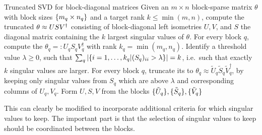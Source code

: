 \begin{Algorithm}{Truncated SVD for block-diagonal matrices}{
    Given an $m \times n$ block-sparse matrix $\theta$ with block sizes $\set{m_q \times n_q}$ and a target rank $k \leq \min(m, n)$, compute the truncated  $\theta\approx U S V^\dagger$ consisting of block-diagonal left isometries $U, V$, and $S$ the diagonal matrix containing the $k$ largest singular values of $\theta$.
    \label{algo:tensornets:symmetries:truncated_svd}
}
    \step For every block $q$, compute the  $\theta_q =: U_q S_q V_q^\dagger$ with rank $k_q = \min(m_q, n_q)$.
    \step Identify a threshold value $\lambda \geq 0$, such that $\sum_q \abs{\setdef{i=1,\dots,k_q}{(S_q)_{ii} > \lambda}} = k$, i.e.~such that exactly $k$ singular values are larger.
    \step For every block $q$, truncate its  to $\theta_q \approx \tilde{U}_q \tilde{S}_q \tilde{V}_q^\dagger$, by keeping only singular values from $S_q$ which are above $\lambda$ and corresponding columns of $U_q, V_q$.
    \step Form $U, S, V$ from the blocks $\set{\tilde{U}_q}, \set{\tilde{S}_q}, \set{\tilde{V}_q}$
\end{Algorithm}

This can clearly be modified to incorporate additional criteria for which singular values to keep.
%
The important part is that the selection of singular values to keep should be coordinated between the blocks.
